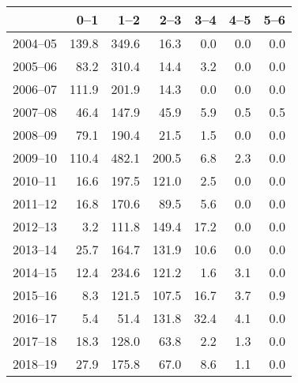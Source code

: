 \begin{table}[ht]
\centering
\begin{tabular}{rrrrrrr}
  \hline
 & 0--1 & 1--2 & 2--3 & 3--4 & 4--5 & 5--6 \\ 
  \hline
2004--05 & 139.8 & 349.6 & 16.3 & 0.0 & 0.0 & 0.0 \\ 
  2005--06 & 83.2 & 310.4 & 14.4 & 3.2 & 0.0 & 0.0 \\ 
  2006--07 & 111.9 & 201.9 & 14.3 & 0.0 & 0.0 & 0.0 \\ 
  2007--08 & 46.4 & 147.9 & 45.9 & 5.9 & 0.5 & 0.5 \\ 
  2008--09 & 79.1 & 190.4 & 21.5 & 1.5 & 0.0 & 0.0 \\ 
  2009--10 & 110.4 & 482.1 & 200.5 & 6.8 & 2.3 & 0.0 \\ 
  2010--11 & 16.6 & 197.5 & 121.0 & 2.5 & 0.0 & 0.0 \\ 
  2011--12 & 16.8 & 170.6 & 89.5 & 5.6 & 0.0 & 0.0 \\ 
  2012--13 & 3.2 & 111.8 & 149.4 & 17.2 & 0.0 & 0.0 \\ 
  2013--14 & 25.7 & 164.7 & 131.9 & 10.6 & 0.0 & 0.0 \\ 
  2014--15 & 12.4 & 234.6 & 121.2 & 1.6 & 3.1 & 0.0 \\ 
  2015--16 & 8.3 & 121.5 & 107.5 & 16.7 & 3.7 & 0.9 \\ 
  2016--17 & 5.4 & 51.4 & 131.8 & 32.4 & 4.1 & 0.0 \\ 
  2017--18 & 18.3 & 128.0 & 63.8 & 2.2 & 1.3 & 0.0 \\ 
  2018--19 & 27.9 & 175.8 & 67.0 & 8.6 & 1.1 & 0.0 \\ 
   \hline
\end{tabular}
\end{table}
